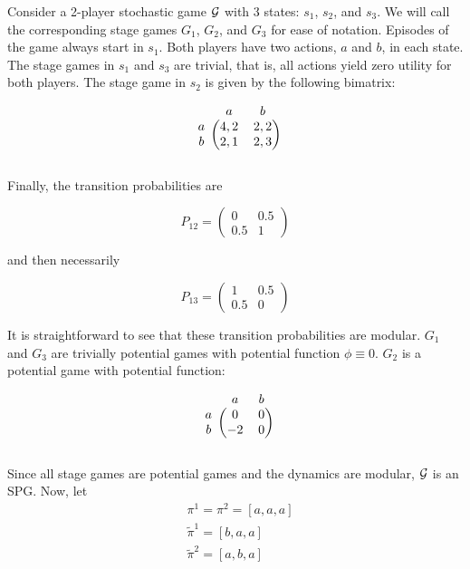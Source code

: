 \begin{eg}
Consider a 2-player stochastic game $\mathcal{G}$ with 3 states: $s_1$, $s_2$, and $s_3$. We will call the corresponding stage games $G_1$, $G_2$, and $G_3$ for ease of notation. Episodes of the game always start in $s_1$. Both players have two actions, $a$ and $b$, in each state. The stage games in $s_1$ and $s_3$ are trivial, that is, all actions yield zero utility for both players. The stage game in $s_2$ is given by the following bimatrix:

\[
\begin{blockarray}{ccc}
 & a & b \\
\begin{block}{c(cc)}
  a & 4,2 & 2,2 \\
  b & 2,1 & 2,3 \\
\end{block}
\end{blockarray}
 \]

Finally, the transition probabilities are

$$
P_{12} = 
\begin{pmatrix} 
0 & 0.5 \\
0.5 & 1 
\end{pmatrix}
$$

and then necessarily

$$
P_{13} =
\begin{pmatrix} 
1 & 0.5 \\
0.5 & 0 
\end{pmatrix}
$$

It is straightforward to see that these transition probabilities are modular. $G_{1}$ and $G_{3}$ are trivially potential games with potential function $\phi \equiv 0$. $G_{2}$ is a potential game with potential function:

\[
\begin{blockarray}{ccc}
 & a & b \\
\begin{block}{c(cc)}
  a & 0 & 0 \\
  b & -2 & 0 \\
\end{block}
\end{blockarray}
 \]


Since all stage games are potential games and the dynamics are modular, $\mathcal{G}$ is an SPG. Now, let
\begin{align*}
&\pi^1 = \pi^2 = [a,a,a] \\
&\tilde{\pi}^1 = [b,a,a] \\
&\tilde{\pi}^2 = [a,b,a]
\end{align*}


\end{eg}
